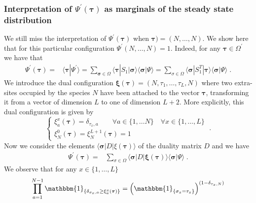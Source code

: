 \documentclass[10pt]{article}
\numberwithin{equation}{section}
\numberwithin{equation}{subsection}
\newcommand{\dt}{\;.}
\begin{document}
\subsubsection{Interpretation of $\Psi^{'}(\bm{\tau})$ as marginals of the steady state distribution}\label{subsection-interpretationPSIp}
We still miss the interpretation of $\Psi^{'}(\bm{\tau})$ when  $\bm{\tau})= (N,\ldots,N)$. We show here that for this particular configuration
$\Psi^{'}(N,\ldots,N) =1$. Indeed, for any $\bm{\tau}\in \Omega^{'}$ we have that 
\begin{align}
	\Psi^{'}(\bm{\tau})=&\langle\bm{\tau}|\Psi^{'}\rangle=\sum_{\bm{\sigma}\in \Omega}\langle \bm{\tau}|S_{1}|\bm{\sigma}\rangle\langle \bm{\sigma}|\Psi\rangle=\sum_{\sigma\in \Omega}\langle \bm{\sigma}|S_{1}^{T}|\bm{\tau}\rangle\langle \bm{\sigma}|\Psi\rangle\dt
\end{align}
We introduce the dual configuration $\bm{\xi}(\bm{\tau})=(N,\tau_{1},\ldots,\tau_{L},N)$ where two extra-sites occupied by the species $N$ have been attached to the vector $\bm{\tau}$, transforming it from a vector of dimension $L$ to one of dimension $L+2$. More explicitly, this dual configuration is given by
\begin{equation}
	\begin{cases}
	\xi_{a}^{x}(\bm{\tau})= \delta_{\tau_{x},a}\qquad \forall a\in \{1,\ldots N\}\quad \forall x\in \{1,\ldots,L\}\\
	\xi_{N}^{0}(\bm{\tau})=\xi_{N}^{L+1}(\bm{\tau})=1
\end{cases}\dt
\end{equation} Now we consider the elements $\langle\bm{\sigma}|D|\xi(\bm{\tau})\rangle$ of the duality matrix $D$ and we have
\begin{align}\label{useful-InInterpretation}
	\Psi^{'}(\bm{\tau})=&\sum_{\sigma\in \Omega}\langle \bm{\sigma}|D|\bm{\xi}(\bm{\tau})\rangle\langle \bm{\sigma}|\Psi\rangle\dt
\end{align}
We observe that for any $x\in \{1,\ldots,L\}$
\begin{equation}
	\prod_{a=1}^{N-1}\mathbbm{1}_{\{\delta_{\sigma_{x},a}\geq\xi_{a}^{x}(\bm{\tau})\}}=\left(\mathbbm{1}_{\{\sigma_{x}=\tau_{x}\}}\right)^{(1-\delta_{\tau_{x},N})}%
\end{equation}
\end{document}
